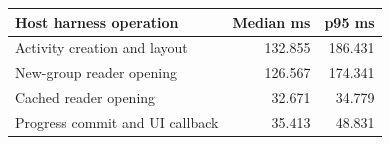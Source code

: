 \begin{center}\begin{tabular}{lrr}\toprule
Host harness operation & Median ms & p95 ms\\\midrule
Activity creation and layout & 132.855 & 186.431\\
New-group reader opening & 126.567 & 174.341\\
Cached reader opening & 32.671 & 34.779\\
Progress commit and UI callback & 35.413 & 48.831\\
\bottomrule\end{tabular}\end{center}
